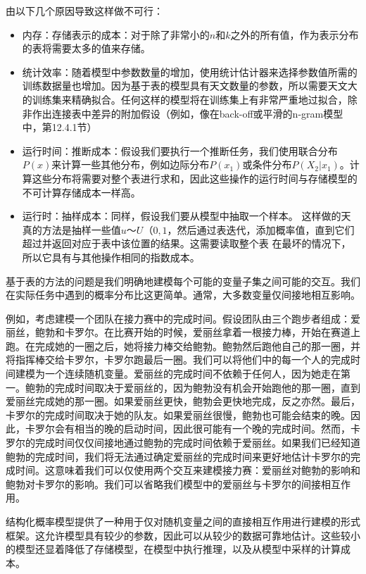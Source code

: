 由以下几个原因导致这样做不可行：
\begin{itemize}
\item 内存：存储表示的成本：对于除了非常小的$n$和$k$之外的所有值，作为表示分布的表将需要太多的值来存储。
\item 统计效率：随着模型中参数数量的增加，使用统计估计器来选择参数值所需的训练数据量也增加。因为基于表的模型具有天文数量的参数，所以需要天文大的训练集来精确拟合。任何这样的模型将在训练集上有非常严重地过拟合，除非作出连接表中差异的附加假设（例如，像在back-off或平滑的n-gram模型中，第12.4.1节）
\item 运行时间：推断成本：假设我们要执行一个推断任务，我们使用联合分布$P(x)$来计算一些其他分布，例如边际分布$P(x_1)$或条件分布$P(X_2|x_1)$。计算这些分布将需要对整个表进行求和，因此这些操作的运行时间与存储模型的不可计算存储成本一样高。
\item 运行时：抽样成本：同样，假设我们要从模型中抽取一个样本。 这样做的天真的方法是抽样一些值$u〜U（0,1$，然后通过表迭代，添加概率值，直到它们超过并返回对应于表中该位置的结果。这需要读取整个表 在最坏的情况下，所以它具有与其他操作相同的指数成本。
\end{itemize}

基于表的方法的问题是我们明确地建模每个可能的变量子集之间可能的交互。我们在实际任务中遇到的概率分布比这更简单。通常，大多数变量仅间接地相互影响。

例如，考虑建模一个团队在接力赛中的完成时间。假设团队由三个跑步者组成：爱丽丝，鲍勃和卡罗尔。在比赛开始的时候，爱丽丝拿着一根接力棒，开始在赛道上跑。在完成她的一圈之后，她将接力棒交给鲍勃。鲍勃然后跑他自己的那一圈，并将指挥棒交给卡罗尔，卡罗尔跑最后一圈。我们可以将他们中的每一个人的完成时间建模为一个连续随机变量。爱丽丝的完成时间不依赖于任何人，因为她走在第一。鲍勃的完成时间取决于爱丽丝的，因为鲍勃没有机会开始跑他的那一圈，直到爱丽丝完成她的那一圈。如果爱丽丝更快，鲍勃会更快地完成，反之亦然。最后，卡罗尔的完成时间取决于她的队友。如果爱丽丝很慢，鲍勃也可能会结束的晚。因此，卡罗尔会有相当的晚的启动时间，因此很可能有一个晚的完成时间。然而，卡罗尔的完成时间仅仅间接地通过鲍勃的完成时间依赖于爱丽丝。如果我们已经知道鲍勃的完成时间，我们将无法通过确定爱丽丝的完成时间来更好地估计卡罗尔的完成时间。这意味着我们可以仅使用两个交互来建模接力赛：爱丽丝对鲍勃的影响和鲍勃对卡罗尔的影响。我们可以省略我们模型中的爱丽丝与卡罗尔的间接相互作用。

结构化概率模型提供了一种用于仅对随机变量之间的直接相互作用进行建模的形式框架。这允许模型具有较少的参数，因此可以从较少的数据可靠地估计。这些较小的模型还显着降低了存储模型，在模型中执行推理，以及从模型中采样的计算成本。

